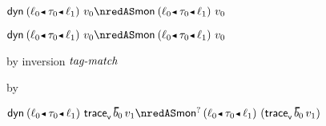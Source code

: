 {\begin{lamportproof*}
    \begin{pfproof}
      $\edynb{\obnd{\sowner_0}{\stype_0}{\sowner_1}}{\svalue_0} \nredAS \emon{\obnd{\sowner_0}{\stype_0}{\sowner_1}}{\svalue_0}$
    \end{pfproof}

    \begin{pfproof}
      $\edynb{\obnd{\sowner_0}{\stype_0}{\sowner_1}}{\svalue_0} \nredAS \emon{\obnd{\sowner_0}{\stype_0}{\sowner_1}}{\svalue_0}$
    \end{pfproof}

    \begin{pfproof}
        \begin{pfproof}
          by inversion $\textit{tag-match}$
        \end{pfproof}
        \begin{pfproof}
          by \pfih
        \end{pfproof}
      \qedstep
        \begin{pfproof}
          {$\edynb{\obnd{\sowner_0}{\stype_0}{\sowner_1}}{\ehist{\sblist_0}{\svalue_1}} \nredAS \emopt{\obnd{\sowner_0}{\stype_0}{\sowner_1}}{(\ehist{\sblist_0}{\svalue_1})}$}
        \end{pfproof}
    \end{pfproof}

\end{lamportproof*}}

